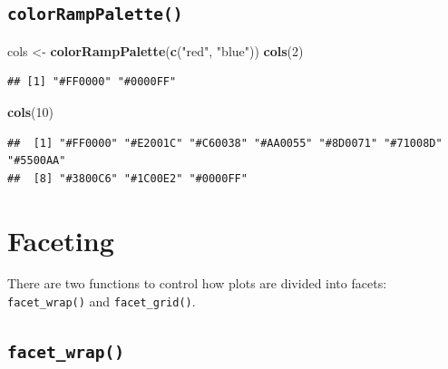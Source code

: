 \documentclass[
]{book}
\newenvironment{Shaded}{\begin{snugshade}}{\end{snugshade}}
\newcommand{\DecValTok}[1]{\textcolor[rgb]{0.00,0.00,0.81}{#1}}
\newcommand{\KeywordTok}[1]{\textcolor[rgb]{0.13,0.29,0.53}{\textbf{#1}}}
\newcommand{\NormalTok}[1]{#1}
\newcommand{\StringTok}[1]{\textcolor[rgb]{0.31,0.60,0.02}{#1}}
\begin{document}
\hypertarget{colorramppalette}{%
\subsection*{\texorpdfstring{\texttt{colorRampPalette()}}{colorRampPalette()}}\label{colorramppalette}}

\begin{Shaded}
\begin{Highlighting}[]
\NormalTok{cols <-}\StringTok{ }\KeywordTok{colorRampPalette}\NormalTok{(}\KeywordTok{c}\NormalTok{(}\StringTok{"red"}\NormalTok{, }\StringTok{"blue"}\NormalTok{))}
\KeywordTok{cols}\NormalTok{(}\DecValTok{2}\NormalTok{)}
\end{Highlighting}
\end{Shaded}

\begin{verbatim}
## [1] "#FF0000" "#0000FF"
\end{verbatim}

\begin{Shaded}
\begin{Highlighting}[]
\KeywordTok{cols}\NormalTok{(}\DecValTok{10}\NormalTok{)}
\end{Highlighting}
\end{Shaded}

\begin{verbatim}
##  [1] "#FF0000" "#E2001C" "#C60038" "#AA0055" "#8D0071" "#71008D" "#5500AA"
##  [8] "#3800C6" "#1C00E2" "#0000FF"
\end{verbatim}

\hypertarget{faceting}{%
\section{Faceting}\label{faceting}}

There are two functions to control how plots are divided into facets: \texttt{facet\_wrap()} and \texttt{facet\_grid()}.

\hypertarget{facet_wrap}{%
\subsection*{\texorpdfstring{\texttt{facet\_wrap()}}{facet\_wrap()}}\label{facet_wrap}}
\end{document}

